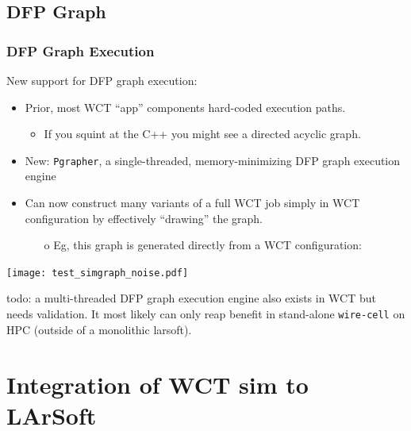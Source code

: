 \documentclass[xcolor=dvipsnames]{beamer}
\begin{document}
\subsection{DFP Graph}
\begin{frame}
  \frametitle{DFP Graph Execution}
  New support for DFP graph execution:
  \begin{itemize}\footnotesize
  \item Prior, most WCT ``app'' components hard-coded execution paths.
    \begin{itemize}\tiny
    \item If you squint at the C++ you might see a directed acyclic graph.
    \end{itemize}
  \item New: \texttt{Pgrapher}, a single-threaded, memory-minimizing
    DFP graph execution engine
  \item Can now construct many variants of a full WCT job simply in
    WCT configuration by effectively ``drawing'' the graph.
    \begin{itemize}\scriptsize
    \item[o] Eg, this graph is generated directly from a WCT configuration:
    \end{itemize}
  \end{itemize}
  \texttt{[image: test\_simgraph\_noise.pdf]}

  \tiny todo: a multi-threaded DFP graph execution engine also exists
  in WCT but needs validation. 
  It most likely can only reap benefit in stand-alone
  \texttt{wire-cell} on HPC (outside of a monolithic larsoft).

\end{frame}

\section{Integration of WCT sim to LArSoft}
\begin{frame}
\end{frame}
\end{document}

